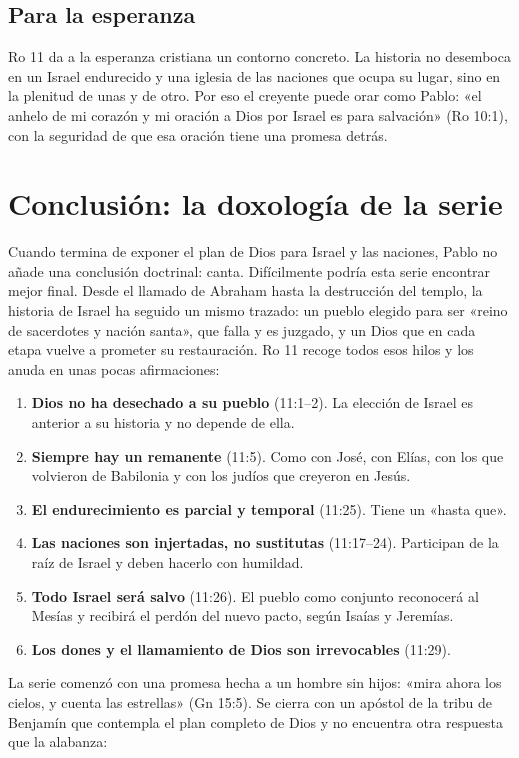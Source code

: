 \subsection{Para la esperanza}
Ro 11 da a la esperanza cristiana un contorno concreto. La historia no desemboca en un Israel endurecido y una iglesia de las naciones que ocupa su lugar, sino en la plenitud de unas y de otro. Por eso el creyente puede orar como Pablo: «el anhelo de mi corazón y mi oración a Dios por Israel es para salvación» (Ro 10:1), con la seguridad de que esa oración tiene una promesa detrás.

\section{Conclusión: la doxología de la serie}

Cuando termina de exponer el plan de Dios para Israel y las naciones, Pablo no añade una conclusión doctrinal: canta. Difícilmente podría esta serie encontrar mejor final. Desde el llamado de Abraham hasta la destrucción del templo, la historia de Israel ha seguido un mismo trazado: un pueblo elegido para ser «reino de sacerdotes y nación santa», que falla y es juzgado, y un Dios que en cada etapa vuelve a prometer su restauración. Ro 11 recoge todos esos hilos y los anuda en unas pocas afirmaciones:

\begin{enumerate}
\item \textbf{Dios no ha desechado a su pueblo} (11:1--2). La elección de Israel es anterior a su historia y no depende de ella.
\item \textbf{Siempre hay un remanente} (11:5). Como con José, con Elías, con los que volvieron de Babilonia y con los judíos que creyeron en Jesús.
\item \textbf{El endurecimiento es parcial y temporal} (11:25). Tiene un «hasta que».
\item \textbf{Las naciones son injertadas, no sustitutas} (11:17--24). Participan de la raíz de Israel y deben hacerlo con humildad.
\item \textbf{Todo Israel será salvo} (11:26). El pueblo como conjunto reconocerá al Mesías y recibirá el perdón del nuevo pacto, según Isaías y Jeremías.
\item \textbf{Los dones y el llamamiento de Dios son irrevocables} (11:29).
\end{enumerate}

La serie comenzó con una promesa hecha a un hombre sin hijos: «mira ahora los cielos, y cuenta las estrellas» (Gn 15:5). Se cierra con un apóstol de la tribu de Benjamín que contempla el plan completo de Dios y no encuentra otra respuesta que la alabanza:

